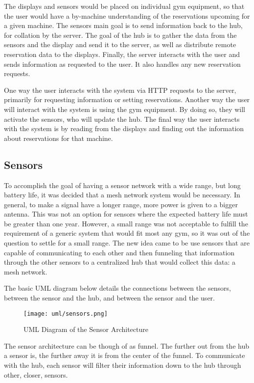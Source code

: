 \documentclass[PPFS.tex]{template/subfiles}
\begin{document}
The displays and sensors would be placed on individual gym equipment, so that the user would have a by-machine understanding of the reservations upcoming for a given machine. The sensors main goal is to send information back to the hub, for collation by the server. The goal of the hub is to gather the data from the sensors and the display and send it to the server, as well as distribute remote reservation data to the displays. Finally, the server interacts with the user and sends information as requested to the user. It also handles any new reservation requests.

One way the user interacts with the system via HTTP requests to the server, primarily for requesting information or setting reservations. Another way the user will interact with the system is using the gym equipment. By doing so, they will activate the sensors, who will update the hub. The final way the user interacts with the system is by reading from the displays and finding out the information about reservations for that machine.

\subsection{Sensors}

To accomplish the goal of having a sensor network with a wide range, but long battery life, it was decided that a mesh network system would be necessary. In general, to make a signal have a longer range, more power is given to a bigger antenna. This was not an option for sensors where the expected battery life must be greater than one year. However, a small range was not acceptable to fulfill the requirement of a generic system that would fit most any gym, so it was out of the question to settle for a small range. The new idea came to be use sensors that are capable of communicating to each other and then funneling that information through the other sensors to a centralized hub that would collect this data: a mesh network.

The basic UML diagram below details the connections between the sensors, between the sensor and the hub, and between the sensor and the user.

\begin{figure}[H]
    \centering
    \texttt{[image: uml/sensors.png]}
    \caption{UML Diagram of the Sensor Architecture}
\end{figure}

The sensor architecture can be though of as funnel. The further out from the hub a sensor is, the further away it is from the center of the funnel. To communicate with the hub, each sensor will filter their information down to the hub through other, closer, sensors. 
\end{document}
